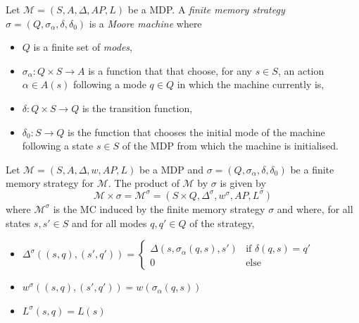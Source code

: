 \begin{definition}
Let $\mathcal{M} = (S, A, \Delta, AP, L)$ be a MDP.
A \textit{finite memory strategy} $\sigma = (Q, \sigma_\alpha, \delta, \delta_0)$ is a \textit{Moore machine} where
\begin{itemize}
	\item $Q$ is a finite set of \textit{modes},
	\item $\sigma_\alpha: Q \times S \rightarrow A$ is a function that that choose, for any $s \in S$, an action $\alpha \in A(s)$ following a mode $q \in Q$ in which the machine currently is,
	\item $\delta: Q \times S \rightarrow Q$ is the transition function,
	\item $\delta_0: S \rightarrow Q$ is the function that chooses the initial mode of the machine following a state $s \in S$ of the MDP from which the machine is initialised.
\end{itemize}
\end{definition}

\begin{definition}
Let $\mathcal{M} = (S, A, \Delta, w, AP, L)$ be a MDP and $\sigma = (Q, \sigma_\alpha, \delta, \delta_0)$ be a finite memory strategy for $\mathcal{M}$.
The product of $\mathcal{M}$ by $\sigma$ is given by
\[ \mathcal{M} \times \sigma = \mathcal{M}^\sigma = (S \times Q, \Delta^\sigma, w^\sigma, AP, L^\sigma) \]
where $\mathcal{M}^\sigma$ is the MC induced by the finite memory strategy $\sigma$ and where,
for all states $s, s' \in S$ and for all modes $q, q' \in Q$ of the strategy,
\begin{itemize}
	\item $\Delta^\sigma((s, q), (s', q')) =
	\begin{cases}
	\Delta(s, \sigma_\alpha(q, s), s') & \text{if } \delta(q, s) = q'\\
	0  & \text{else}
	\end{cases}$
  \item $w^\sigma((s, q), (s', q')) = w(\sigma_\alpha(q, s))$
  \item $L^\sigma(s, q) = L(s)$
\end{itemize}
\end{definition}

